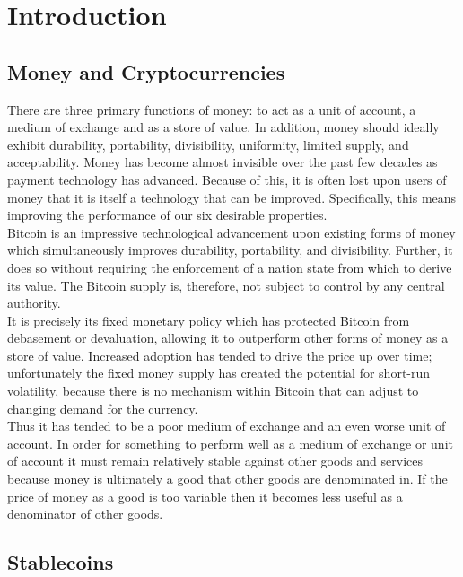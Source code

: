 \section{Introduction}

\subsection{Money and Cryptocurrencies}

There are three primary functions of money: to act as a unit of account, a medium of exchange
and as a store of value. In addition, money should ideally exhibit durability,
portability, divisibility, uniformity, limited supply, and acceptability.
Money has become almost invisible over the past few decades as payment technology has advanced.
Because of this, it is often lost upon users of money that it is itself a technology that can be
improved. Specifically, this means improving the performance of our six desirable properties. \\

\noindent Bitcoin is an impressive technological advancement upon existing forms of money which
simultaneously improves durability, portability, and divisibility.
Further, it does so without requiring the enforcement of a nation state from which to derive its value.
The Bitcoin supply is, therefore, not subject to control by any central authority. \\

\noindent It is precisely its fixed monetary policy which has protected Bitcoin from debasement or
devaluation, allowing it to outperform other forms of money as a store of value. Increased adoption
has tended to drive the price up over time; unfortunately the fixed money supply has created the
potential for short-run volatility, because there is no mechanism within Bitcoin that can
adjust to changing demand for the currency. \\

\noindent Thus it has tended to be a poor medium of exchange and an even worse unit of account.
In order for something to perform well as a medium of exchange or unit of account it must remain
relatively stable against other goods and services because money is ultimately a good that other goods
are denominated in. If the price of money as a good is too variable then it becomes less useful as a
denominator of other goods.

\subsection{Stablecoins}

